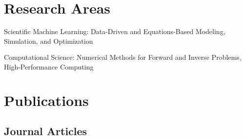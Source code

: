 \documentclass[11pt,letterpaper]{report}
\newcommand{\listitemspace}{0.25em}
\renewenvironment{itemize}
{\begin{list}{}{\setlength{\leftmargin}{0em}
                \setlength{\parskip}{0em}
                \setlength{\itemsep}{\listitemspace}
                \setlength{\parsep}{\listitemspace}}}
{\end{list}}
\begin{document}
    \section*{Research Areas}

    \begin{itemize}

        \item Scientific Machine Learning: Data-Driven and Equations-Based Modeling, Simulation, and Optimization

        \item Computational Science: Numerical Methods for Forward and Inverse Problems, High-Performance Computing
    \end{itemize}



    \section*{Publications}

    \subsection*{Journal Articles}
\end{document}
